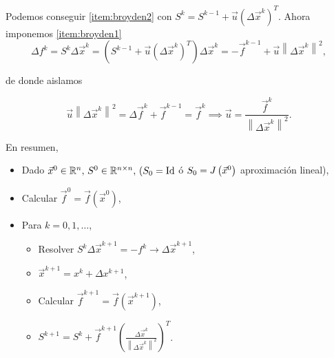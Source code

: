 \noindent Podemos conseguir \ref{item:broyden2} con $S^k = S^{k-1} + \vec{u}\left( \Delta\vec{x}^k \right)^T$.
Ahora imponemos \ref{item:broyden1}
\[
    \Delta f^k = S^k\Delta \vec{x}^k = \left( S^{k-1}+\vec{u}\left( \Delta\vec{x}^k \right)^T \right)\Delta\vec{x}^k = -\vec{f}^{k-1} + \vec{u}\left\| \Delta \vec{x}^k\right\|^2,
\]

\noindent de donde aislamos

\[
    \vec{u}\left\|\Delta\vec{x}^k\right\|^2 = \Delta \vec{f}^k + \vec{f}^{k-1} = \vec{f}^k \implies \vec{u} = \frac{\vec{f}^k}{\left\|\Delta\vec{x}^k\right\|^2}.
\]

\noindent En resumen,
\begin{itemize}
    \item Dado $\vec{x}^0\in\mathbb{R}^n,\, S^0 \in \mathbb{R}^{n\times n},\, (S_0 = \operatorname{Id}$ ó $S_0 = J\left( \vec{x}^0\right)$ aproximación lineal),
    \item Calcular $\vec{f}^0 = \vec{f}\left( \vec{x}^0 \right)$,
    \item Para $k = 0, 1, \dots$,
        \begin{itemize}
            \item Resolver $S^k \Delta \vec{x}^{k+1} = -f^k \longrightarrow \Delta\vec{x}^{k+1}$,
            \item $\vec{x}^{k+1} = x^k + \Delta x^{k+1}$,
            \item Calcular $\vec{f}^{k+1} = \vec{f}\left( \vec{x}^{k+1} \right)$,
            \item $S^{k+1} = S^k + \vec{f}^{k+1}\left( \frac{\Delta\vec{x}^k}{\left\|\Delta \vec{x}^k \right\|^2} \right)^T$.
        \end{itemize}
\end{itemize}
